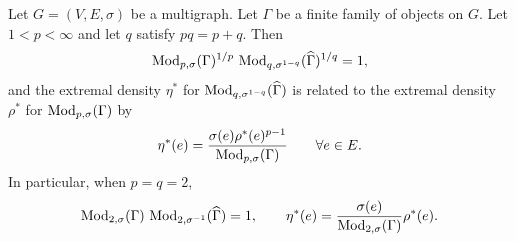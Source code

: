 \begin{theorem}
\label{thm:modulus-fulkerson-duality}
\notready
Let $G = (V, E, \sigma)$ be a multigraph. Let $\Gamma$ be a finite family of
objects on $G$. Let $1 < p <
\infty$ and let $q$ satisfy $pq = p + q$. Then
\[
  \operatorname{Mod}_{p,\sigma}(\Gamma)^{1/p} \, \operatorname{Mod}_{q,\sigma^{1-q}}(\widehat\Gamma)^{1/q} = 1,
\]
and the extremal density $\eta^*$ for $\operatorname{Mod}_{q,\sigma^{1-q}}(\widehat\Gamma)$ is
related to the extremal density $\rho^*$ for $\operatorname{Mod}_{p,\sigma}(\Gamma)$ by
\[
  \eta^*(e) = \frac{\sigma(e) \rho^*(e)^{p-1}}{\operatorname{Mod}_{p,\sigma}(\Gamma)} \qquad \forall e \in E.
\]
In particular, when $p = q = 2$,
\[
  \operatorname{Mod}_{2,\sigma}(\Gamma) \, \operatorname{Mod}_{2,\sigma^{-1}}(\widehat\Gamma) = 1,
  \qquad
  \eta^*(e) = \frac{\sigma(e)}{\operatorname{Mod}_{2,\sigma}(\Gamma)} \rho^*(e).
\]
\end{theorem}
